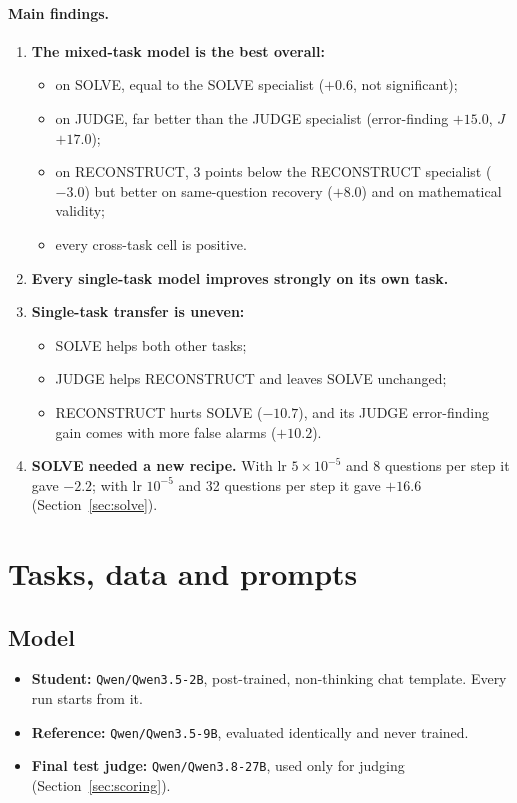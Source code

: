 \documentclass[10pt,a4paper]{article}
\begin{document}
\paragraph{Main findings.}
\begin{enumerate}
\item \textbf{The mixed-task model is the best overall:}
  \begin{itemize}
  \item on SOLVE, equal to the SOLVE specialist ($+0.6$, not significant);
  \item on JUDGE, far better than the JUDGE specialist (error-finding $+15.0$, $J$ $+17.0$);
  \item on RECONSTRUCT, 3 points below the RECONSTRUCT specialist ($-3.0$) but better on same-question recovery
        ($+8.0$) and on mathematical validity;
  \item every cross-task cell is positive.
  \end{itemize}
\item \textbf{Every single-task model improves strongly on its own task.}
\item \textbf{Single-task transfer is uneven:}
  \begin{itemize}
  \item SOLVE helps both other tasks;
  \item JUDGE helps RECONSTRUCT and leaves SOLVE unchanged;
  \item RECONSTRUCT hurts SOLVE ($-10.7$), and its JUDGE error-finding gain comes with more false alarms ($+10.2$).
  \end{itemize}
\item \textbf{SOLVE needed a new recipe.} With lr $5\times10^{-5}$ and 8 questions per step it gave $-2.2$; with lr
  $10^{-5}$ and 32 questions per step it gave $+16.6$ (Section~\ref{sec:solve}).
\end{enumerate}

\section{Tasks, data and prompts}

\subsection{Model}
\begin{itemize}
\item \textbf{Student:} \texttt{Qwen/Qwen3.5-2B}, post-trained, non-thinking chat template. Every run starts from it.
\item \textbf{Reference:} \texttt{Qwen/Qwen3.5-9B}, evaluated identically and never trained.
\item \textbf{Final test judge:} \texttt{Qwen/Qwen3.8-27B}, used only for judging (Section~\ref{sec:scoring}).
\end{itemize}
\end{document}
